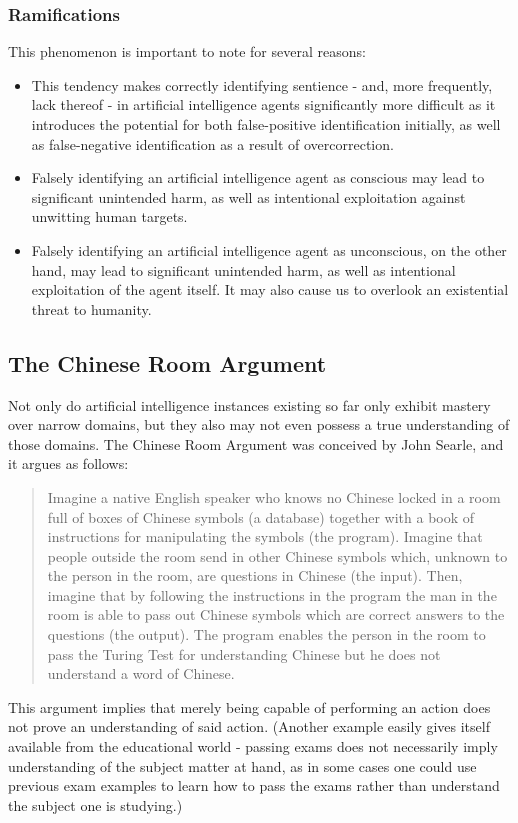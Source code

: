 \documentclass[masterthesis]{fer}
\begin{document}
\subsubsection{Ramifications}

This phenomenon is important to note for several reasons:
\begin{itemize}
\item This tendency makes correctly identifying sentience - and, more frequently, lack thereof - in artificial intelligence agents significantly more difficult as it introduces the potential for both false-positive identification initially, as well as false-negative identification as a result of overcorrection.
\item Falsely identifying an artificial intelligence agent as conscious may lead to significant unintended harm, as well as intentional exploitation against unwitting human targets.
\item Falsely identifying an artificial intelligence agent as unconscious, on the other hand, may lead to significant unintended harm, as well as intentional exploitation of the agent itself. It may also cause us to overlook an existential threat to humanity.
\end{itemize}

\subsection{The Chinese Room Argument}
Not only do artificial intelligence instances existing so far only exhibit mastery over narrow domains, but they also may not even possess a true understanding of those domains.
The Chinese Room Argument was conceived by John Searle, and it argues as follows:
\begin{quote}
Imagine a native English speaker who knows no Chinese locked in a room full of boxes of Chinese symbols (a database) together with a book of instructions for manipulating the symbols (the program). Imagine that people outside the room send in other Chinese symbols which, unknown to the person in the room, are questions in Chinese (the input). Then, imagine that by following the instructions in the program the man in the room is able to pass out Chinese symbols which are correct answers to the questions (the output). The program enables the person in the room to pass the Turing Test for understanding Chinese but he does not understand a word of Chinese.
\cite{cole_2004}
\end{quote}
   This argument implies that merely being capable of performing an action does not prove an understanding of said action. (Another example easily gives itself available from the educational world - passing exams does not necessarily imply understanding of the subject matter at hand, as in some cases one could use previous exam examples to learn how to pass the exams rather than understand the subject one is studying.)
\end{document}
